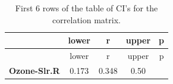\documentclass[]{article}
\theoremstyle{definition}
\theoremstyle{definition}
\theoremstyle{definition}
\theoremstyle{remark}
\begin{document}
\begin{longtable}[]{@{}ccccc@{}}
\caption{First 6 rows of the table of CI's for the correlation
matrix.}\tabularnewline
\toprule
\begin{minipage}[b]{0.21\columnwidth}\centering\strut
~\strut
\end{minipage} & \begin{minipage}[b]{0.11\columnwidth}\centering\strut
lower\strut
\end{minipage} & \begin{minipage}[b]{0.11\columnwidth}\centering\strut
r\strut
\end{minipage} & \begin{minipage}[b]{0.10\columnwidth}\centering\strut
upper\strut
\end{minipage} & \begin{minipage}[b]{0.10\columnwidth}\centering\strut
p\strut
\end{minipage}\tabularnewline
\midrule
\endfirsthead
\toprule
\begin{minipage}[b]{0.21\columnwidth}\centering\strut
~\strut
\end{minipage} & \begin{minipage}[b]{0.11\columnwidth}\centering\strut
lower\strut
\end{minipage} & \begin{minipage}[b]{0.11\columnwidth}\centering\strut
r\strut
\end{minipage} & \begin{minipage}[b]{0.10\columnwidth}\centering\strut
upper\strut
\end{minipage} & \begin{minipage}[b]{0.10\columnwidth}\centering\strut
p\strut
\end{minipage}\tabularnewline
\midrule
\endhead
\begin{minipage}[t]{0.21\columnwidth}\centering\strut
\textbf{Ozone-Slr.R}\strut
\end{minipage} & \begin{minipage}[t]{0.11\columnwidth}\centering\strut
0.173\strut
\end{minipage} & \begin{minipage}[t]{0.11\columnwidth}\centering\strut
0.348\strut
\end{minipage} & \begin{minipage}[t]{0.10\columnwidth}\centering\strut
0.50\strut
\end{minipage} & \begin{minipage}[t]{0.10\columnwidth}\centering\strut

\end{minipage}
\end{longtable}
\end{document}
